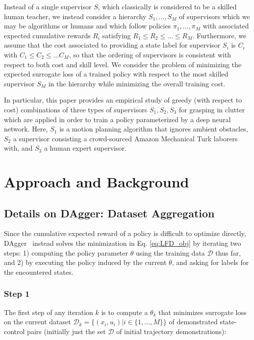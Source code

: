 \documentclass[10pt, conference]{ieeeconf}      %
\begin{document}
Instead of a single supervisor $S$, which classically is considered to be a skilled human teacher, we instead consider a
hierarchy $S_1, \ldots, S_M$ of supervisors which we may be algorithms or humans and which follow policies $\pi_1, \ldots, \pi_M$ with
associated expected cumulative rewards $R_i$ satisfying $R_1\le R_2 \le \ldots \le
R_M$. Furthermore, we assume that the cost associated to providing a state
label for supervisor $S_i$ is $C_i$ with $C_1\le C_2 \le \ldots C_M$, so that the ordering of supervisors is consistent
with respect to both cost and skill level. We consider the problem of minimizing the expected surrogate loss of a
trained policy with respect to the most skilled supervisor $S_M$ in the hierarchy while minimizing the overall training
cost.

In particular, this paper provides an empirical study of greedy (with respect to cost) combinations of three types of supervisors $S_1,
S_2, S_3$ for grasping in clutter which are applied in order to train a policy parameterized by a deep neural network.
Here, $S_1$ is a motion planning algorithm that ignores ambient obstacles, $S_2$ a supervisor
consisting a crowd-sourced Amazon Mechanical Turk laborers with, and $S_3$ a human expert supervisor.

\section{Approach and Background}
 \subsection{Details on DAgger: Dataset Aggregation}
Since the cumulative expected reward of a policy is difficult to optimize directly,
DAgger~\cite{ross2010reduction} instead solves the minimization in Eq. \ref{eq:LFD_obj} by iterating two steps: 1)
computing the policy parameter $\theta$ using the training data $\mathcal{D}$ thus far, and 2) by executing the policy
induced by the current $\theta$, and asking for labels for the encountered states. 
 
\subsubsection{Step 1}
The first step of any iteration $k$ is to compute a $\theta_k$ that minimizes surrogate loss on the current dataset $\mathcal{D}_k=\{(x_i,u_i)|i\in\{1,\ldots,M\}\}$ of demonstrated state-control pairs (initially just the set $\mathcal{D}$ of initial trajectory demonstrations):
\end{document}
